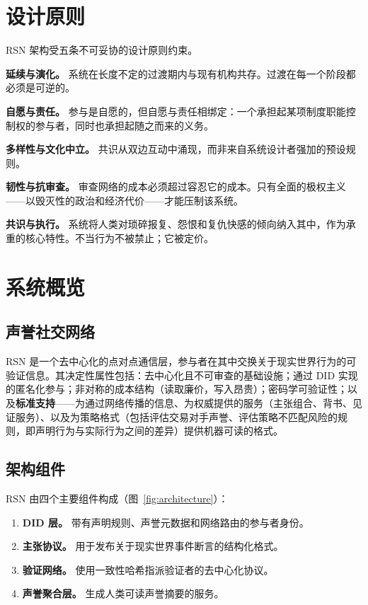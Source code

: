\documentclass[11pt,a4paper,twocolumn]{article}
\begin{document}
\section{设计原则}

RSN 架构受五条不可妥协的设计原则约束。

\textbf{延续与演化。} 系统在长度不定的过渡期内与现有机构共存。过渡在每一个阶段都必须是可逆的。

\textbf{自愿与责任。} 参与是自愿的，但自愿与责任相绑定：一个承担起某项制度职能控制权的参与者，同时也承担起随之而来的义务。

\textbf{多样性与文化中立。} 共识从双边互动中涌现，而非来自系统设计者强加的预设规则。

\textbf{韧性与抗审查。} 审查网络的成本必须超过容忍它的成本。只有全面的极权主义——以毁灭性的政治和经济代价——才能压制该系统。

\textbf{共识与执行。} 系统将人类对琐碎报复、怨恨和复仇快感的倾向纳入其中，作为承重的核心特性。不当行为不被禁止；它被定价。

\section{系统概览}

\subsection{声誉社交网络}

RSN 是一个去中心化的点对点通信层，参与者在其中交换关于现实世界行为的可验证信息。其决定性属性包括：去中心化且不可审查的基础设施；通过 DID 实现的匿名化参与；非对称的成本结构（读取廉价，写入昂贵）；密码学可验证性；以及\textbf{标准支持}——为通过网络传播的信息、为权威提供的服务（主张组合、背书、见证服务）、以及为策略格式（包括评估交易对手声誉、评估策略不匹配风险的规则，即声明行为与实际行为之间的差异）提供机器可读的格式。

\subsection{架构组件}

RSN 由四个主要组件构成（图~\ref{fig:architecture}）：
\begin{enumerate}[nosep]
\item \textbf{DID 层。} 带有声明规则、声誉元数据和网络路由的参与者身份。
\item \textbf{主张协议。} 用于发布关于现实世界事件断言的结构化格式。
\item \textbf{验证网络。} 使用一致性哈希指派验证者的去中心化协议。
\item \textbf{声誉聚合层。} 生成人类可读声誉摘要的服务。
\end{enumerate}
\end{document}
